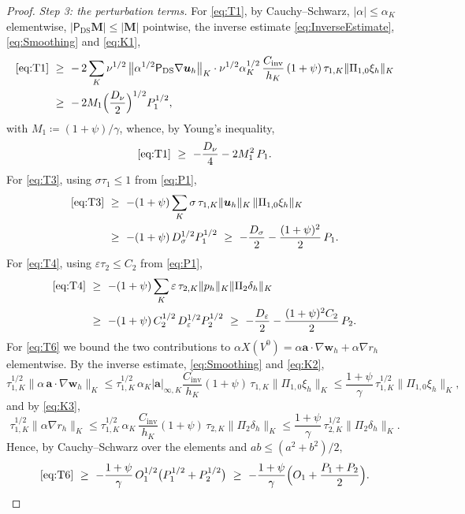 \documentclass[11pt]{article}
\theoremstyle{remark}
\newcommand{\bu}{\boldsymbol{u}}
\newcommand{\bw}{\boldsymbol{w}}
\newcommand{\ba}{\boldsymbol{a}}
\newcommand{\ViscProj}{\mathsf{P}_{\mathrm{DS}}}
\newcommand{\norm}[1]{\lVert #1 \rVert}
\newcommand{\normK}[1]{\lVert #1 \rVert_{K}}
\newcommand{\Ptwo}{\Pi_{2}}
\newcommand{\Ponez}{\Pi_{1,0}}
\begin{document}
\begin{proof}
\medskip\noindent\emph{Step 3: the perturbation terms.}
For \cref{eq:T1}, by Cauchy--Schwarz, $|\alpha| \le \alpha_K$ elementwise,
$|\ViscProj \boldsymbol{M}| \le |\boldsymbol{M}|$ pointwise, the inverse estimate
\cref{eq:InverseEstimate}, \cref{eq:Smoothing} and \cref{eq:K1},
\begin{align*}
  \text{\cref{eq:T1}}
  &\ \ge\ -\,2\sum_K \nu^{1/2}\,\bigl\lVert\alpha^{1/2}\ViscProj\nabla\bu_h\bigr\rVert_K
  \cdot \nu^{1/2}\alpha_K^{1/2}\,\frac{C_{\mathrm{inv}}}{h_K}\,(1+\psi)\,\tau_{1,K}
  \norm{\Ponez\xi_h}_K\\
  &\ \ge\ -\,2 M_1 \Bigl(\frac{D_\nu}{2}\Bigr)^{1/2} P_1^{1/2},
\end{align*}
with $M_1 \coloneqq (1+\psi)/\gamma$, whence, by Young's inequality,
\[
  \text{\cref{eq:T1}} \ \ge\ -\frac{D_\nu}{4} - 2M_1^2\, P_1 .
\]
For \cref{eq:T3}, using $\sigma\tau_1 \le 1$ from \cref{eq:P1},
\begin{align*}
  \text{\cref{eq:T3}}
  &\ \ge\ -(1+\psi)\sum_K \sigma\,\tau_{1,K}\normK{\bu_h}\,\normK{\Ponez\xi_h}\\
  &\ \ge\ -(1+\psi)\, D_\sigma^{1/2} P_1^{1/2}
  \ \ge\ -\frac{D_\sigma}{2} - \frac{(1+\psi)^2}{2}\,P_1 .
\end{align*}
For \cref{eq:T4}, using $\varepsilon\tau_2 \le C_2$ from \cref{eq:P1},
\begin{align*}
  \text{\cref{eq:T4}}
  &\ \ge\ -(1+\psi)\sum_K \varepsilon\,\tau_{2,K}\normK{p_h}\normK{\Ptwo\delta_h}\\
  &\ \ge\ -(1+\psi)\,C_2^{1/2}\, D_\varepsilon^{1/2} P_2^{1/2}
  \ \ge\ -\frac{D_\varepsilon}{2} - \frac{(1+\psi)^2 C_2}{2}\,P_2 .
\end{align*}
For \cref{eq:T6} we bound the two contributions to
$\alpha X(V^0) = \alpha\ba\cdot\nabla\bw_h + \alpha\nabla r_h$ elementwise. By the
inverse estimate, \cref{eq:Smoothing} and \cref{eq:K2},
\[
  \tau_{1,K}^{1/2}\normK{\alpha\,\ba\cdot\nabla\bw_h}
  \le \tau_{1,K}^{1/2}\,\alpha_K |\ba|_{\infty,K}\frac{C_{\mathrm{inv}}}{h_K}
  (1+\psi)\,\tau_{1,K}\normK{\Ponez\xi_h}
  \le \frac{1+\psi}{\gamma}\,\tau_{1,K}^{1/2}\normK{\Ponez\xi_h},
\]
and by \cref{eq:K3},
\[
  \tau_{1,K}^{1/2}\normK{\alpha\nabla r_h}
  \le \tau_{1,K}^{1/2}\,\alpha_K\,\frac{C_{\mathrm{inv}}}{h_K}(1+\psi)\,
  \tau_{2,K}\normK{\Ptwo\delta_h}
  \le \frac{1+\psi}{\gamma}\,\tau_{2,K}^{1/2}\normK{\Ptwo\delta_h}.
\]
Hence, by Cauchy--Schwarz over the elements and $ab \le (a^2+b^2)/2$,
\[
  \text{\cref{eq:T6}}
  \ \ge\ -\frac{1+\psi}{\gamma}\, O_1^{1/2}\bigl( P_1^{1/2} + P_2^{1/2} \bigr)
  \ \ge\ -\frac{1+\psi}{\gamma}\Bigl( O_1 + \frac{P_1 + P_2}{2} \Bigr).
\]
\end{proof}
\end{document}
